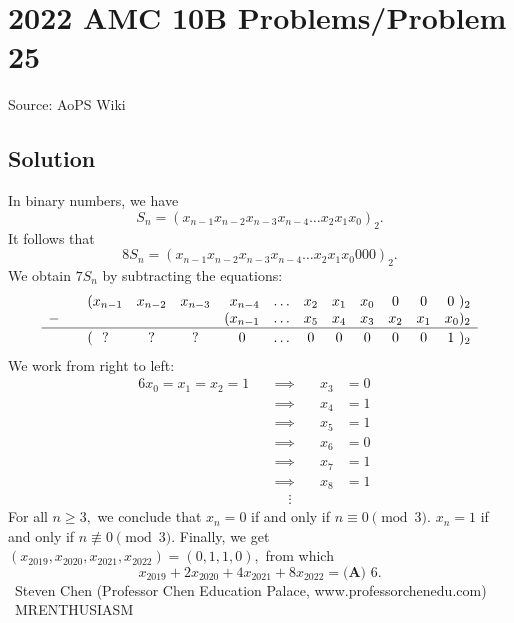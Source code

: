 \documentclass[12pt]{article}
\begin{document}
\section*{{2022 AMC 10B Problems/Problem 25}}
Source: AoPS Wiki

\subsection*{Solution}
In binary numbers, we have \[S_n = (x_{n-1} x_{n-2} x_{n-3} x_{n-4} \ldots x_{2} x_{1} x_{0})_2.\] It follows that \[8S_n = (x_{n-1} x_{n-2} x_{n-3} x_{n-4} \ldots x_{2} x_{1} x_{0}000)_2.\] We obtain $7S_n$ by subtracting the equations: \[\begin{array}{clccrccccccr} & (x_{n-1} & x_{n-2} & x_{n-3} & x_{n-4} & \ldots & x_2 & x_1 & x_0 & 0 & 0 & 0 \ )_2 \\ -\quad & & & & (x_{n-1} & \ldots & x_5 & x_4 & x_3 & x_2 & x_1 & x_0)_2 \\ \hline & & & & & & & & & & & \\ [-2.5ex] & ( \ \ ?& ? & ? & 0 \ \ \ & \ldots & 0 & 0 & 0 & 0 & 0 & 1 \ )_2 \\ \end{array}\] We work from right to left: \begin{alignat*}{6} x_0=x_1=x_2=1 \quad &\implies \quad &x_3 &= 0& \\ \quad &\implies \quad &x_4 &= 1& \\ \quad &\implies \quad &x_5 &= 1& \\ \quad &\implies \quad &x_6 &= 0& \\ \quad &\implies \quad &x_7 &= 1& \\ \quad &\implies \quad &x_8 &= 1& \\ \quad &\quad \vdots & & & \end{alignat*} For all $n\geq3,$ we conclude that $x_n=0$ if and only if $n\equiv 0\pmod{3}.$ $x_n=1$ if and only if $n\not\equiv 0\pmod{3}.$ Finally, we get $(x_{2019},x_{2020},x_{2021},x_{2022})=(0,1,1,0),$ from which \[x_{2019} + 2x_{2020} + 4x_{2021} + 8x_{2022} = \boxed{\textbf{(A) } 6}.\] ~Steven Chen (Professor Chen Education Palace, www.professorchenedu.com) ~MRENTHUSIASM
\end{document}
